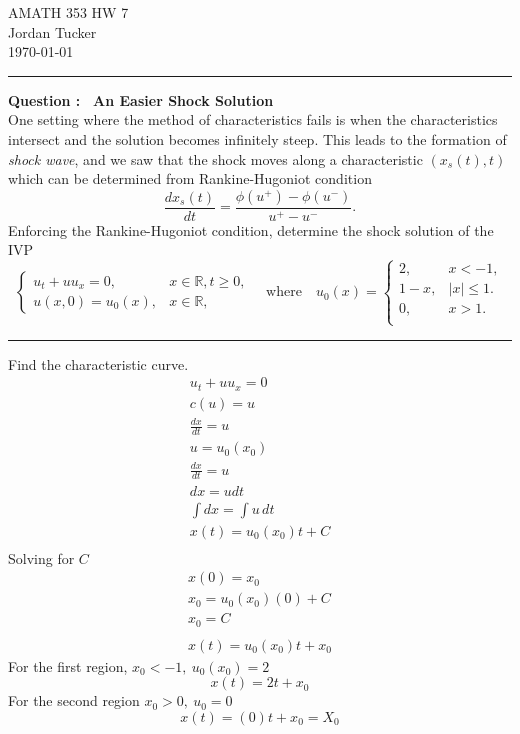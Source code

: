 \documentclass[letterpaper,11pt]{article}
\newcommand{\R}{\mathbb{R}}
\newcounter{questionCounter}
\newcounter{partCounter}[questionCounter]
\newcommand{\question}[1]{%
    \stepcounter{questionCounter}%
    \setcounter{partCounter}{0}%
    \vspace{0.25in}
    \hrule
    \vspace{0.4em}
    \noindent\textbf{Question \thequestionCounter:\ }#1
    \vspace{0.8em}
    \hrule
    \vspace{0.1in}
}
\newcommand{\myhwname}{AMATH 353 HW 7}
\newcommand{\myname}{Jordan Tucker}
\newcommand{\header}{
    \begin{center}
    {\Large \myhwname}\\
    \myname\\
    \today
    \end{center}
}
\begin{document}
    \header
    \question{
        \textbf{An Easier Shock Solution}\\
        One setting where the method of characteristics fails is when
        the characteristics intersect and the solution becomes infinitely steep.
        This leads to the formation of \textit{shock wave}, and
        we saw that the shock moves along a characteristic
        $(x_s(t),t)$ which can be determined from Rankine-Hugoniot condition
        \[
            \frac{dx_s(t)}{dt} =\frac{\phi(u^+)-\phi(u^-)}{u^+-u^-}.
        \]
        Enforcing the Rankine-Hugoniot condition, determine
        the shock solution of the IVP
        \[
            \begin{cases}
                u_t + uu_x = 0, & x \in \R, t \ge 0,\\
                u(x,0)= u_0(x), & x \in \R,
            \end{cases}
            \quad \text{where}\quad
            u_0(x) =
            \begin{cases}
                2, &x<-1,\\
                1-x, & |x|\le 1.\\
                0, &x>1.\\
            \end{cases}
        \]
    }
    Find the characteristic curve.
    \begin{gather*}
        u_t + uu_x =0\\
        c(u) = u\\
        \frac{dx}{dt} = u\\
        u = u_0(x_0)\\
        \frac{dx}{dt} = u\\
        dx = u dt\\
        \int dx = \int u \,dt\\
        x(t) = u_0(x_0) t + C\\
    \end{gather*}
    Solving for $C$
    \begin{gather*}
        x(0) = x_0\\
        x_0 = u_0(x_0) (0) + C\\
        x_0 = C\\\\
        x(t) = u_0(x_0) t + x_0
    \end{gather*}
    For the first region, $x_0<-1,\ u_0(x_0)=2$
    \[
        x(t) = 2t +x_0
    \]
    For the second region $x_0 > 0, \ u_0 =0$
    \[
        x(t) = (0) t +x_0 = X_0
    \]
\end{document}
